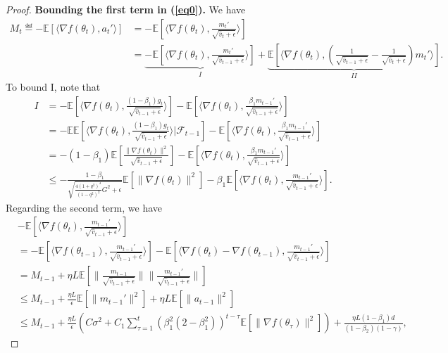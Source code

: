 \documentclass[11pt]{article}
\begin{document}
\begin{proof}
\textbf{Bounding the first term in (\ref{eq0}).} We have
\begin{align*}
    M_t\eqdef -\mathbb E[\langle \nabla f(\theta_t), a_t'\rangle]&=-\mathbb E[\langle \nabla f(\theta_t), \frac{m_t'}{\sqrt{\hat v_t+\epsilon}}\rangle]\\
    &=\underbrace{-\mathbb E[\langle \nabla f(\theta_t), \frac{m_t'}{\sqrt{\hat v_{t-1}+\epsilon}} \rangle]}_{I}+\underbrace{\mathbb E[\langle \nabla f(\theta_t), (\frac{1}{\sqrt{\hat v_{t-1}+\epsilon}}-\frac{1}{\sqrt{\hat v_t+\epsilon}})m_t' \rangle]}_{II}.
\end{align*}
To bound I, note that
\begin{align*}
    I&=-\mathbb E[\langle \nabla f(\theta_t), \frac{(1-\beta_1)g_t}{\sqrt{\hat v_{t-1}+\epsilon}} \rangle] -\mathbb E[\langle \nabla f(\theta_t), \frac{\beta_1 m_{t-1}'}{\sqrt{\hat v_{t-1}+\epsilon}} \rangle]\\
    &=-\mathbb E\mathbb E[\langle \nabla f(\theta_t), \frac{(1-\beta_1)g_t}{\sqrt{\hat v_{t-1}+\epsilon}} \rangle|\mathcal F_{t-1}] -\mathbb E[\langle \nabla f(\theta_t), \frac{\beta_1 m_{t-1}'}{\sqrt{\hat v_{t-1}+\epsilon}} \rangle]\\
    &=-(1-\beta_1)\mathbb E[\frac{\|\nabla f(\theta_t)\|^2}{\sqrt{\hat v_{t-1}+\epsilon}}] - \mathbb E[\langle \nabla f(\theta_t), \frac{\beta_1 m_{t-1}'}{\sqrt{\hat v_{t-1}+\epsilon}} \rangle]\\
    &\leq -\frac{1-\beta_1}{\sqrt{\frac{4(1+q^2)^3}{(1-q^2)^2}G^2+\epsilon}}\mathbb E[\|\nabla f(\theta_t)\|^2]- \beta_1\mathbb E[\langle \nabla f(\theta_t), \frac{ m_{t-1}'}{\sqrt{\hat v_{t-1}+\epsilon}} \rangle].
\end{align*}
Regarding the second term, we have
\begin{align*}
    &- \mathbb E[\langle \nabla f(\theta_t), \frac{ m_{t-1}'}{\sqrt{\hat v_{t-1}+\epsilon}} \rangle]\\
    &=-\mathbb E[\langle\nabla f(\theta_{t-1}), \frac{ m_{t-1}'}{\sqrt{\hat v_{t-1}+\epsilon}} \rangle]- \mathbb E[\langle \nabla f(\theta_t)-\nabla f(\theta_{t-1}), \frac{ m_{t-1}'}{\sqrt{\hat v_{t-1}+\epsilon}} \rangle]\\
    &=M_{t-1}+ \eta L\mathbb E[\|\frac{m_{t-1}}{\sqrt{\hat v_{t-1}+\epsilon}}\| \|\frac{m_{t-1}'}{\sqrt{\hat v_{t-1}+\epsilon}}\|]\\
    &\leq M_{t-1}+\frac{\eta L}{\epsilon}\mathbb E[\|m_{t-1}'\|^2]+\eta L\mathbb E[\|a_{t-1}\|^2]\\
    &\leq M_{t-1}+\frac{\eta L}{\epsilon}(C\sigma^2+C_1\sum_{\tau=1}^t (\beta_1^2(2-\beta_1^2))^{t-\tau}\mathbb E[\|\nabla f(\theta_\tau)\|^2])+\frac{\eta L(1-\beta_1)d}{(1-\beta_2)(1-\gamma)},

\end{align*}
\end{proof}
\end{document}
